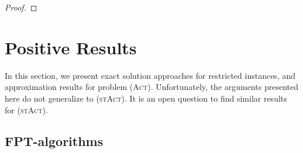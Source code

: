 \documentclass[runningheads]{llncs}
\numberwithin{equation}{section}
\newcommand{\set}[1]{\{ #1 \}}
\newcommand{\act}{\textsc{(Act)}}
\newcommand{\stact}{\textsc{(stAct)}}
\begin{document}
\begin{proof}
\end{proof}


\section{Positive Results}
\label{sec:positive_results}

In this section, we present exact solution approaches for restricted instances, and approximation results for problem {\act}. Unfortunately, the arguments presented here do not generalize to \stact. It is an open question to find similar results for \stact. 

\subsection{FPT-algorithms}
\end{document}
